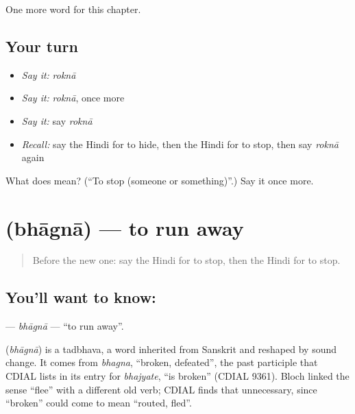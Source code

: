 \begin{grammarlens}[title={What you've built}]
One more word for this chapter.
\end{grammarlens}

\subsection*{Your turn}
\begin{itemize}
\raggedright
  \item \emph{Say it:} \emph{roknā}
  \item \emph{Say it:} \emph{roknā}, once more
  \item \emph{Say it:} say \emph{roknā}
  \item \emph{Recall:} say the Hindi for to hide, then the Hindi for to stop, then say \emph{roknā} again
\end{itemize}

\begin{tcolorbox}[breakable,colback=teal!4,colframe=teal!35!black,title={Before you move on}]
What does  mean? (\textquotedblleft{}To stop (someone or something)\textquotedblright{}.) Say it once more.
\end{tcolorbox}
\section[\texorpdfstring{\hi{भागना} (bhāgnā)}{भागना (bhāgnā)}]{ (bhāgnā) — to run away}

\label{lesson:HI-C172-bhagna}



\begin{quote}
Before the new one: say the Hindi for to stop, then the Hindi for to stop.
\end{quote}

\subsection*{You'll want to know: }
\textbf{} — \emph{bhāgnā} — \textquotedblleft{}to run away\textquotedblright{}.

\begin{cousinweb}
\textbf{} (\emph{bhāgnā}) is a tadbhava, a word inherited from Sanskrit and reshaped by sound change. It comes from \emph{bhagna}, \textquotedblleft{}broken, defeated\textquotedblright{}, the past participle that CDIAL lists in its entry for \emph{bhajyate}, \textquotedblleft{}is broken\textquotedblright{} (CDIAL 9361). Bloch linked the sense \textquotedblleft{}flee\textquotedblright{} with a different old verb; CDIAL finds that unnecessary, since \textquotedblleft{}broken\textquotedblright{} could come to mean \textquotedblleft{}routed, fled\textquotedblright{}.
\end{cousinweb}

